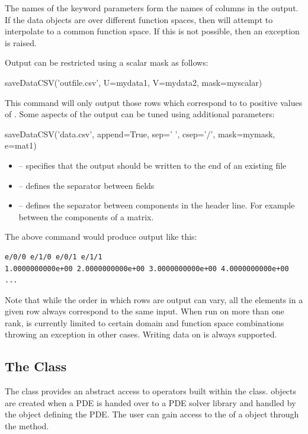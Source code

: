 The names of the keyword parameters form the names of columns in the output.
If the data objects are over different function spaces, then 
will attempt to interpolate to a common function space.
If this is not possible, then an exception is raised.

Output can be restricted using a scalar mask as follows:
\begin{python}
  saveDataCSV('outfile.csv', U=mydata1, V=mydata2, mask=myscalar)
\end{python}
This command will only output those rows which correspond to to positive
values of .
Some aspects of the output can be tuned using additional parameters:
\begin{python}
  saveDataCSV('data.csv', append=True, sep=' ', csep='/', mask=mymask, e=mat1)
\end{python}

\begin{itemize}
 \item {} -- specifies that the output should be written to the end of an existing file
 \item {} -- defines the separator between fields
 \item {} -- defines the separator between components in the header
     line. For example between the components of a matrix.
\end{itemize}
%
The above command would produce output like this:
\begin{verbatim}
e/0/0 e/1/0 e/0/1 e/1/1
1.0000000000e+00 2.0000000000e+00 3.0000000000e+00 4.0000000000e+00
...
\end{verbatim}

Note that while the order in which rows are output can vary, all the elements
in a given row always correspond to the same input.
When run on more than one \MPI rank,  is currently
limited to certain domain and function space combinations throwing an exception
in other cases. Writing data on \ContinuousFunction is always supported.

\subsection{The \Operator Class}
The \Operator class provides an abstract access to operators built
within the \LinearPDE class. \Operator objects are created
when a PDE is handed over to a PDE solver library and handled
by the \LinearPDE object defining the PDE. The user can gain access
to the \Operator of a \LinearPDE object through the 
method.

